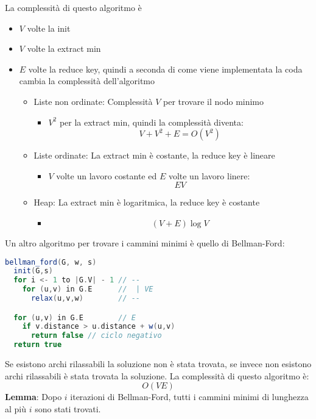 \documentclass[a4paper]{article}
\begin{document}
\vspace{1em}
\noindent
La complessità di questo algoritmo è
\begin{itemize}
  \item \( V \) volte la init
  \item \( V \) volte la extract min
  \item \( E \) volte la reduce key, quindi a seconda di come viene
    implementata la coda cambia la complessità dell'algoritmo
    \begin{itemize}
      \item Liste non ordinate: Complessità \( V \) per trovare il nodo minimo
        \begin{itemize}
          \item \( V^2 \) per la extract min, quindi la complessità diventa:
            \[
              V + V^2 + E = O(V^2)
            \] 
        \end{itemize}

      \item Liste ordinate: La extract min è costante, la reduce key è lineare
        \begin{itemize}
          \item \( V \) volte un lavoro costante ed \( E \) volte un lavoro linere:
            \[
              EV
            \] 
        \end{itemize}

      \item Heap: La extract min è logaritmica, la reduce key è costante
        \begin{itemize}
          \item 
            \[
              (V + E) \log V
            \] 
        \end{itemize}
    \end{itemize}
\end{itemize}

\vspace{1em}
\noindent
Un altro algoritmo per trovare i cammini minimi è quello di Bellman-Ford:
\begin{lstlisting}[language=Scala]
bellman_ford(G, w, s)
  init(G,s)
  for i <- 1 to |G.V| - 1 // --
    for (u,v) in G.E      //  | VE
      relax(u,v,w)        // --

  for (u,v) in G.E        // E
    if v.distance > u.distance + w(u,v)
      return false // ciclo negativo
  return true
\end{lstlisting}
Se esistono archi rilassabili la soluzione non è stata trovata, se invece non esistono
archi rilassabili è stata trovata la soluzione. La complessità di questo algoritmo è:
\[
  O(VE)
\] 
\vspace{1em}
\noindent
\textbf{Lemma}: Dopo \( i \) iterazioni di Bellman-Ford, tutti i cammini minimi di
lunghezza al più \( i \) sono stati trovati.
\end{document}
